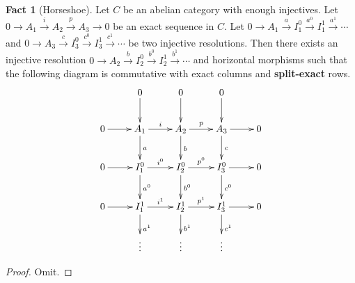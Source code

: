 \documentclass{amsart}
\numberwithin{equation}{section}
\theoremstyle{plain}
\theoremstyle{definition}
\newtheorem{fact}[equation]{Fact}
\DeclareMathOperator{\im}{Im}
\begin{document}
\begin{fact}[Horseshoe]\label{2.6}
	Let $ C $ be an abelian category with enough injectives. 
	Let $ 0\to A_1\xrightarrow{i} A_2\xrightarrow{p} A_3\to 0 $ be an exact sequence in $ C $. 
	Let $ 0\to A_1\xrightarrow{a} I_1^0\xrightarrow{a^0} I_1^1\xrightarrow{a^1} \cdots $ and $ 0\to A_3\xrightarrow{c} I_3^0\xrightarrow{c^0} I_3^1\xrightarrow{c^1} \cdots $ be two injective resolutions. 
	Then there exists an injective resolution $ 0\to A_2\xrightarrow{b} I_2^0\xrightarrow{b^0} I_2^1\xrightarrow{b^1} \cdots $ and horizontal morphisms such that the following diagram is commutative with exact columns and \textbf{split-exact} rows. 
	\[
	\xymatrix{
		& 0\ar[d] & 0\ar[d] & 0\ar[d] & \\
		0\ar[r]& A_1\ar[d]^a\ar[r]^i & A_2\ar[d]^b\ar[r]^p%
		& A_3\ar[d]^c\ar[r] & 0\\
		0\ar[r]& I_1^0\ar[d]^{a^0}\ar[r]^{i^0} & I_2^0\ar[d]^{b^0}\ar[r]^{p^0}%
		& I_3^0\ar[d]^{c^0}\ar[r] & 0\\
		0\ar[r]& I_1^1\ar[d]^{a^1}\ar[r]^{i^1} & I_2^1\ar[d]^{b^1}\ar[r]^{p^1}%
		& I_3^1\ar[d]^{c^1}\ar[r] & 0\\
		& \vdots & \vdots & \vdots & \\
		}
	\]
\end{fact}

\begin{proof}
	Omit.
\end{proof}

%	
%	
\end{document}
